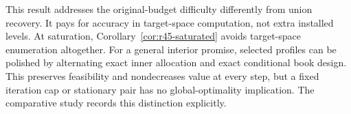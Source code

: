 This result addresses the original-budget difficulty differently from union recovery. It pays for accuracy in target-space computation, not extra installed levels. At saturation, Corollary~\ref{cor:r45-saturated} avoids target-space enumeration altogether. For a general interior promise, selected profiles can be polished by alternating exact inner allocation and exact conditional book design. This preserves feasibility and nondecreases value at every step, but a fixed iteration cap or stationary pair has no global-optimality implication. The comparative study records this distinction explicitly.
